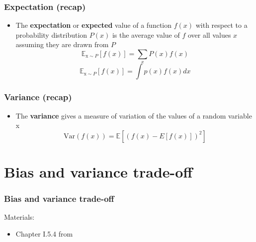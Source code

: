 \documentclass[notes]{beamer}          %
\newcommand{\field}[1]{\mathbb{#1}}
\newif\iffull
\begin{document}
\iffull
\begin{frame}
\frametitle{Cross-validation}
    \begin{itemize}
        \item The original data is partitioned into $k$ (disjoint) subsets.
        \item The average error can be estimated by taking the average over $k$ trials.
        \item In trial $i$, the $i$-th subset is used as test set and the rest as training set.
        \item Problem: no unbiased estimators of the variance of such average error exist, but there are approximations that are used in practice.
    \end{itemize}
\end{frame}
\fi

\begin{frame}
\frametitle{Expectation (recap)}
\begin{itemize}
    \item The {\bf expectation} or {\bf expected} value of a function $f(x)$ with respect to a probability distribution $P(x)$ is the average value of $f$ over all values $x$ assuming they are drawn from $P$
$$\field{E}_{\text{x} \sim P} [f(x)] = \sum_{x} P(x) f(x)$$
$$\field{E}_{\text{x} \sim P} [f(x)] = \int p(x) f(x) dx$$
\end{itemize}

\end{frame}



\begin{frame}
\frametitle{Variance (recap)}
\begin{itemize}
    \item The {\bf variance} gives a measure of variation of the values of a random variable x $$\mbox{Var}(f(x)) = \field{E}[(f(x) - E[f(x)])^2]$$

\end{itemize}

\end{frame}

\section{Bias and variance trade-off}

\begin{frame}
\frametitle{Bias and variance trade-off}
Materials:
\begin{itemize}
    \item Chapter I.5.4 from \cite{deeplearning}
\end{itemize}
\end{frame}
\end{document}
